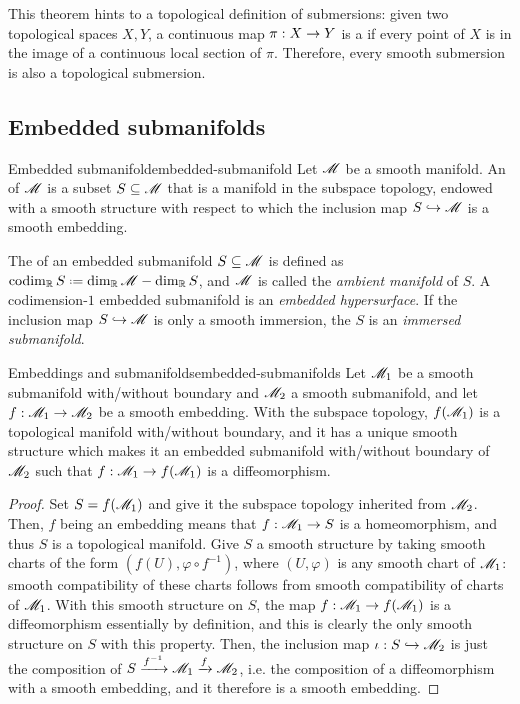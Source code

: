 This theorem hints to a topological definition of submersions: given two topological spaces $ X,Y $, a continuous map $ \pi : X \rightarrow Y $ is a  if every point of $ X $ is in the image of a continuous local section of $ \pi $. Therefore, every smooth submersion is also a topological submersion.

\subsection{Embedded submanifolds}

\begin{definition}{Embedded submanifold}{embedded-submanifold}
  Let $ \mathscr{M} $ be a smooth manifold. An  of $ \mathscr{M} $ is a subset $ S \subseteq \mathscr{M} $ that is a manifold in the subspace topology, endowed with a smooth structure with respect to which the inclusion map $ S \hookrightarrow \mathscr{M} $ is a smooth embedding.
\end{definition}

The  of an embedded submanifold $ S \subseteq \mathscr{M} $ is defined as $ \codim_\R S \defeq \dim_\R \man - \dim_\R S $, and $ \mathscr{M} $ is called the \emph{ambient manifold} of $ S $. A codimension-$ 1 $ embedded submanifold is an \emph{embedded hypersurface}. If the inclusion map $ S \hookrightarrow \mathscr{M} $ is only a smooth immersion, the $ S $ is an \emph{immersed submanifold}.

\begin{proposition}{Embeddings and submanifolds}{embedded-submanifolds}
  Let $ \mathscr{M}_1 $ be a smooth submanifold with/without boundary and $ \mathscr{M}_2 $ a smooth submanifold, and let $ f : \mathscr{M}_1 \rightarrow \mathscr{M}_2 $ be a smooth embedding. With the subspace topology, $ f(\mathscr{M}_1) $ is a topological manifold with/without boundary, and it has a unique smooth structure which makes it an embedded submanifold with/without boundary of $ \mathscr{M}_2 $ such that $ f : \mathscr{M}_1 \rightarrow f(\mathscr{M}_1) $ is a diffeomorphism.
\end{proposition}

\begin{proofbox}
  \begin{proof}
    Set $ S = f(\mathscr{M}_1) $ and give it the subspace topology inherited from $ \mathscr{M}_2 $. Then, $ f $ being an embedding means that $ f : \mathscr{M}_1 \rightarrow S $ is a homeomorphism, and thus $ S $ is a topological manifold. Give $ S $ a smooth structure by taking smooth charts of the form $ (f(U) , \varphi \circ f^{-1}) $, where $ (U,\varphi) $ is any smooth chart of $ \mathscr{M}_1 $: smooth compatibility of these charts follows from smooth compatibility of charts of $ \mathscr{M}_1 $. With this smooth structure on $ S $, the map $ f : \mathscr{M}_1 \rightarrow f(\mathscr{M}_1) $ is a diffeomorphism essentially by definition, and this is clearly the only smooth structure on $ S $ with this property. Then, the inclusion map $ \iota : S \hookrightarrow \mathscr{M}_2 $ is just the composition of $ S \xrightarrow{f^{-1}} \mathscr{M}_1 \xrightarrow{f} \mathscr{M}_2 $, i.e. the composition of a diffeomorphism with a smooth embedding, and it therefore is a smooth embedding.
  \end{proof}
\end{proofbox}

